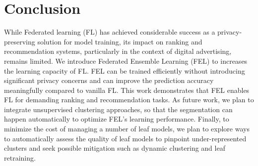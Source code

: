 \documentclass{article}
\begin{document}
\section{Conclusion}
\vspace{-0.25cm}
While Federated learning (FL) has achieved considerable success as a privacy-preserving solution for model training, its impact on ranking and recommendation systems, particularly in the context of digital advertising, remains limited. We introduce Federated Ensemble Learning (FEL) to increases the learning capacity of FL.
FEL can be trained efficiently without introducing significant privacy concerns and can improve the prediction accuracy meaningfully compared to vanilla FL.
This work demonstrates that FEL enables FL for demanding ranking and recommendation tasks. 
%
As future work, we plan to integrate unsupervised clustering approaches, so that the segmentation can happen automatically to optimize FEL's learning performance.
%
Finally, to minimize the cost of managing a number of leaf models, we plan to explore ways to automatically assess the quality of leaf models to pinpoint under-represented clusters and seek possible mitigation such as dynamic clustering and leaf retraining.





\end{document}
